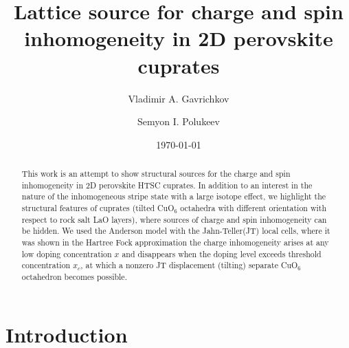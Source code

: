 \documentclass[%
 reprint,
groupedaddress,
 amsmath,amssymb,
 aps,
prb,
]{revtex4-1}
\begin{document}
\title{Lattice source for charge and spin inhomogeneity in 2D perovskite cuprates}
\author{Vladimir A. Gavrichkov}

\author{Semyon I. Polukeev}

\date{\today}

\begin{abstract}

This work is an attempt to show structural sources for the charge and spin inhomogeneity in 2D perovskite HTSC cuprates. In addition to an  interest in the nature of the inhomogeneous stripe state with a large isotope effect, we highlight the structural features of cuprates (tilted CuO$_6$ octahedra with different orientation with respect to rock salt LaO layers), where sources of charge and spin inhomogeneity can be hidden. We used the Anderson model with the Jahn-Teller(JT) local cells, where it was shown in the Hartree Fock approximation the charge inhomogeneity arises at any low doping concentration $x$ and disappears when the doping level exceeds threshold concentration $x_c$, at which a nonzero JT displacement (tilting) separate CuO$_6$ octahedron  becomes possible.

\end{abstract}


\maketitle

\section{\label{sec:intr}Introduction\\}
\end{document}
